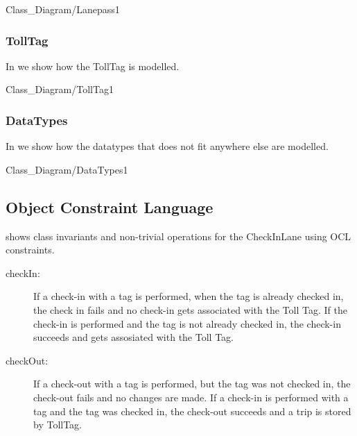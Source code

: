 \begin{myfigure}{Class_Diagram/Lanepass}{1}
\caption{Class Model of the Lanepass.\madeby{\jb}{\mb}}
\label{fig:class-lanepass}
\end{myfigure}

\subsubsection{TollTag}
In  we show how the TollTag is modelled.
\begin{myfigure}{Class_Diagram/TollTag}{1}
\caption{Class Model of TollTag\madeby{\mb}{\mt}}
\label{fig:class-tolltag}
\end{myfigure}

\subsubsection{DataTypes}
In  we show how the datatypes that does not fit anywhere else are modelled.

\begin{myfigure}{Class_Diagram/DataTypes}{1}
\caption{Class Model of Datatypes\madeby{\af}{\kj}}
\label{fig:class-data}
\end{myfigure}




\subsection{Object Constraint Language}
\madeby{\af}{\mb}
 shows class invariants and non-trivial operations for the CheckInLane using OCL constraints.
\begin{description}
\item [checkIn:]If a check-in with a tag is performed, when the tag is already checked in, the check in fails and no check-in gets associated with the Toll Tag. If the check-in is performed and the tag is not already checked in, the check-in succeeds and gets assosiated with the Toll Tag.
\item [checkOut:]If a check-out with a tag is performed, but the tag was not checked in, the check-out fails and no changes are made.
If a check-in is performed with a tag and the tag was checked in, the check-out succeeds and a trip is stored by TollTag.
\end{description}


